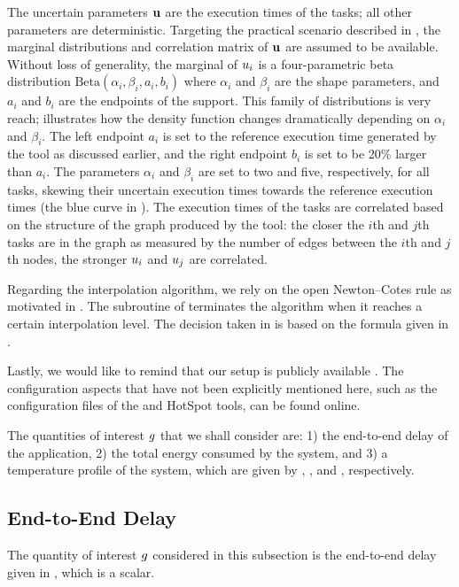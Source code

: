 
The uncertain parameters $\mathbf{u}$ are the execution times of the tasks; all other
parameters are deterministic. Targeting the practical scenario described in
, the marginal distributions and correlation matrix
of $\mathbf{u}$ are assumed to be available. Without loss of generality, the marginal
of $u_i$ is a four-parametric beta distribution $\text{Beta}(\alpha_i, \beta_i,
a_i, b_i)$ where $\alpha_i$ and $\beta_i$ are the shape parameters, and $a_i$
and $b_i$ are the endpoints of the support. This family of distributions is very
reach;  illustrates how the density function changes
dramatically depending on $\alpha_i$ and $\beta_i$. The left endpoint $a_i$ is
set to the reference execution time generated by the  tool as
discussed earlier, and the right endpoint $b_i$ is set to be 20\% larger than
$a_i$. The parameters $\alpha_i$ and $\beta_i$ are set to two and five,
respectively, for all tasks, skewing their uncertain execution times towards the
reference execution times (the blue curve in ). The execution
times of the tasks are correlated based on the structure of the graph produced
by the  tool: the closer the $i$th and $j$th tasks are in the graph
as measured by the number of edges between the $i$th and $j$th nodes, the
stronger $u_i$ and $u_j$ are correlated.

Regarding the interpolation algorithm, we rely on the open Newton--Cotes rule as
motivated in . The  subroutine of
 terminates the algorithm when it reaches a certain
interpolation level. The decision taken in  is based on the
formula given in .

Lastly, we would like to remind that our setup is publicly available
\cite{sources}. The configuration aspects that have not been explicitly
mentioned here, such as the configuration files of the  and HotSpot
tools, can be found online.

The quantities of interest $g$ that we shall consider are: 1) the end-to-end
delay of the application, 2) the total energy consumed by the system, and 3) a
temperature profile of the system, which are given by ,
, and , respectively.

\subsection{End-to-End Delay}

The quantity of interest $g$ considered in this subsection is the end-to-end
delay given in , which is a scalar.

